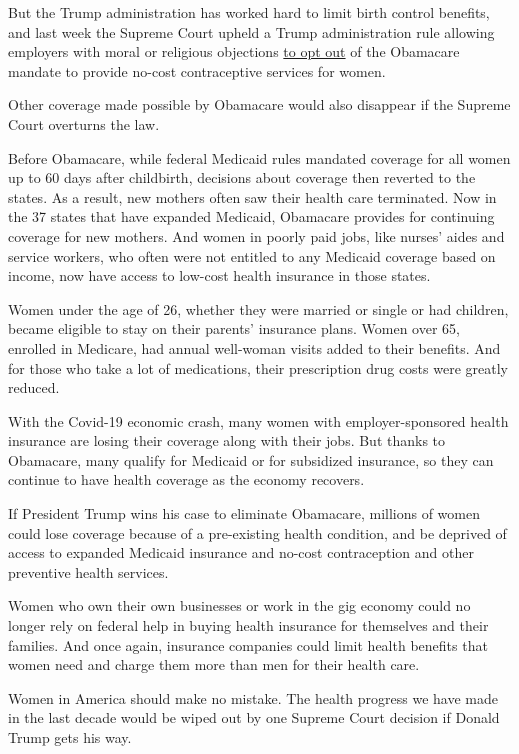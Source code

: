 But the Trump administration has worked hard to limit birth control
benefits, and last week the Supreme Court upheld a Trump administration
rule allowing employers with moral or religious objections
\href{https://www.nytimes.com/2020/07/08/us/supreme-court-birth-control-obamacare.html}{to
opt out} of the Obamacare mandate to provide no-cost contraceptive
services for women.

Other coverage made possible by Obamacare would also disappear if the
Supreme Court overturns the law.

Before Obamacare, while federal Medicaid rules mandated coverage for all
women up to 60 days after childbirth, decisions about coverage then
reverted to the states. As a result, new mothers often saw their health
care terminated. Now in the 37 states that have expanded Medicaid,
Obamacare provides for continuing coverage for new mothers. And women in
poorly paid jobs, like nurses' aides and service workers, who often were
not entitled to any Medicaid coverage based on income, now have access
to low-cost health insurance in those states.

Women under the age of 26, whether they were married or single or had
children, became eligible to stay on their parents' insurance plans.
Women over 65, enrolled in Medicare, had annual well-woman visits added
to their benefits. And for those who take a lot of medications, their
prescription drug costs were greatly reduced.

With the Covid-19 economic crash, many women with employer-sponsored
health insurance are losing their coverage along with their jobs. But
thanks to Obamacare, many qualify for Medicaid or for subsidized
insurance, so they can continue to have health coverage as the economy
recovers.

If President Trump wins his case to eliminate Obamacare, millions of
women could lose coverage because of a pre-existing health condition,
and be deprived of access to expanded Medicaid insurance and no-cost
contraception and other preventive health services.

Women who own their own businesses or work in the gig economy could no
longer rely on federal help in buying health insurance for themselves
and their families. And once again, insurance companies could limit
health benefits that women need and charge them more than men for their
health care.

Women in America should make no mistake. The health progress we have
made in the last decade would be wiped out by one Supreme Court decision
if Donald Trump gets his way.

